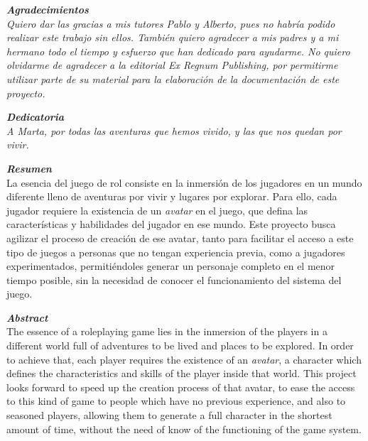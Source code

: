 



\thispagestyle{prefacepage}
{\large \textbf{\textit{Agradecimientos}}} 
\vspace{0.5cm} \\
\textit{Quiero dar las gracias a mis tutores Pablo y Alberto, pues no habría podido 
realizar este trabajo sin ellos. También quiero agradecer a mis padres y a mi hermano 
todo el tiempo y esfuerzo que han dedicado para ayudarme. No quiero olvidarme de agradecer a 
la editorial Ex Regnum Publishing, por permitirme utilizar parte de su material 
para la elaboración de la documentación de este proyecto.}

\blankpage{}

\thispagestyle{prefacepage}
{\large \textbf{\textit{Dedicatoria}}} 
\vspace{0.5cm} \\
\textit{A Marta, por todas las aventuras que hemos vivido, y las que nos quedan por vivir.}

\blankpage{}

\thispagestyle{prefacepage}
{\large \textbf{\textit{Resumen}}} 
\vspace{0.5cm} \\
La esencia del juego de rol consiste en la inmersión de los jugadores en un mundo diferente 
lleno de aventuras por vivir y lugares por explorar. Para ello, cada jugador requiere 
la existencia de un \textit{avatar} en el juego, que defina las características y habilidades del 
jugador en ese mundo. Este proyecto busca agilizar el proceso de creación de ese avatar, tanto para 
facilitar el acceso a este tipo de juegos a personas que no tengan experiencia previa, como a jugadores 
experimentados, permitiéndoles generar un personaje completo en el menor tiempo posible, sin la necesidad 
de conocer el funcionamiento del sistema del juego. 
\vspace{2cm}

{\large \textbf{\textit{Abstract}}} 
\vspace{0.5cm} \\
The essence of a roleplaying game lies in the inmersion of the players in a different world 
full of adventures to be lived and places to be explored. In order to achieve that, each player requires 
the existence of an \textit{avatar}, a character which defines the characteristics and skills of the player 
inside that world. This project looks forward to speed up the creation process of that avatar, to ease 
the access to this kind of game to people which have no previous experience, and also to seasoned players, 
allowing them to generate a full character in the shortest amount of time, without the need of know of 
the functioning of the game system. 
\vspace{2cm}

